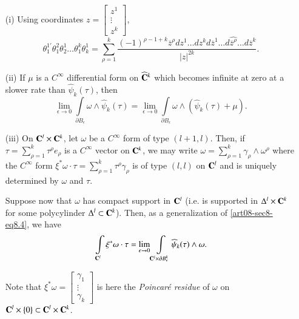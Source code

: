 \begin{remarks*}
\begin{itemize}
\item[(i)] Using coordinates $z=\left[\begin{smallmatrix} z^{1}\\ \vdots \\ z^{k}\end{smallmatrix}\right]$, 
\begin{equation}
\theta^{1'}_{1}\theta^{2}_{1}\theta^{1}_{2}\ldots\theta^{k}_{1}\theta^{1}_{k}=\sum\limits^{k}_{\rho=1}\frac{(-1)^{\rho-1+k}\overline{z}^{\rho}dz^{1}\ldots dz^{k}d\overline{z}^{1}\ldots d\widehat{\overline{z}^{\rho}}\ldots d\overline{z}^{k}}{|z|^{2k}}.\label{art08-sec8-eq8.8}
\end{equation}

\item[(ii)] If $\mu$ is a $C^{\infty}$ differential form on $\widehat{\mathbf{C}}^{k}$ which becomes infinite at zero at a slower rate than $\widehat{\psi}_{k}(\tau)$, then
\begin{equation}
\lim\limits_{\epsilon\to 0}\int\limits_{\partial B_{\epsilon}}\omega \wedge \widehat{\psi}_{k}(\tau)=\lim\limits_{\epsilon\to 0}\int\limits_{\partial B_{\epsilon}}\omega\wedge (\widehat{\psi}_{k}(\tau)+\mu).\label{art08-sec8-eq8.9}
\end{equation}

\item[(iii)] On $\mathbf{C}^{l}\times \mathbf{C}^{k}$, let $\omega$ be a $C^{\infty}$ form of type $(l+1,l)$. Then, if $\tau=\sum\limits^{k}_{\rho=1}\tau^{\rho}e_{\rho}$ is a $C^{\infty}$ vector on $\mathbf{C}^{k}$, we may write $\omega=\sum\limits^{k}_{\rho=1}\gamma_{\rho}\wedge \omega^{\rho}$ where the $C^{\infty}$ form $\xi^{*}\omega\cdot \tau=\sum\limits_{\rho=1}^{k}\tau^{\rho}\gamma_{\rho}$ is of type $(l,l)$ on $\mathbf{C}^{l}$ and is uniquely determined by $\omega$ and $\tau$.

Suppose now that $\omega$ has compact support in $\mathbf{C}^{l}$ (i.e. is supported in $\Delta^{l}\times \mathbf{C}^{k}$ for some polycylinder $\Delta^{l}\subset \mathbf{C}^{k}$). Then, as a generalization of \eqref{art08-sec8-eq8.4}, we have
\begin{equation}
\int\limits_{\mathbf{C}^{l}}\xi^{*}\omega\cdot \tau=\lim\limits_{\epsilon\to 0}\int\limits_{\mathbf{C}^{l}\times \partial B^{k}_{\epsilon}}\widehat{\psi}_{k}(\tau)\wedge \omega.\label{art08-sec8-eq8.10}
\end{equation}\pageoriginale

Note that $\xi^{*}\omega=\left[\begin{smallmatrix} \gamma_{1}\\ \vdots\\ \gamma_{k}\end{smallmatrix}\right]$ is here the {\em Poincar\'e residue} of $\omega$ on $\mathbf{C}^{l}\times \{0\}\subset \mathbf{C}^{l}\times \mathbf{C}^{k}$.


\end{itemize}
\end{remarks*}
